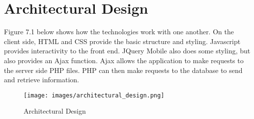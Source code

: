 \chapter{Architectural Design}
Figure 7.1 below shows how the technologies work with one another. On the client side, HTML and CSS provide the basic structure and styling. Javascript provides interactivity to the front end. JQuery Mobile also does some styling, but also provides an Ajax function. Ajax allows the application to make requests to the server side PHP files. PHP can then make requests to the database to send and retrieve information.

\begin{figure}[h]
	\centering
	\texttt{[image: images/architectural\_design.png]}
	\caption{Architectural Design}
	\label{fig:architectural design}
\end{figure}